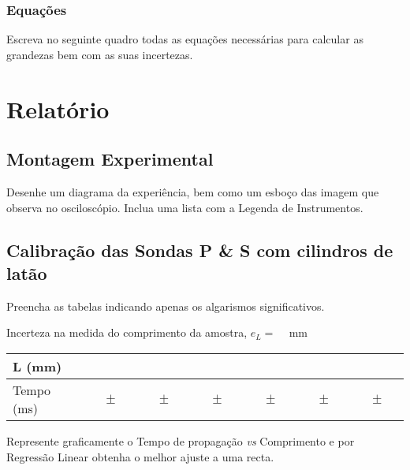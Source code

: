 \documentclass[a4paper,12pt]{article}  %
\begin{document}
\subsubsection{\sf Equações }
Escreva no seguinte quadro todas as equações necessárias para calcular as grandezas bem com as suas incertezas.
\begin{center}
\framebox[15cm]{\rule{0pt}{6.5cm}}
\end{center}


\section{\sf Relatório}
\subsection{\sf Montagem Experimental}
Desenhe um diagrama da experiência, bem como um esboço das imagem que observa no osciloscópio. Inclua uma lista com a Legenda de Instrumentos.

\begin{center}
\framebox[18cm]{\rule{0pt}{6.5cm}}
\end{center}

\subsection{\sf Calibração das Sondas P \& S com cilindros de latão}%
Preencha as  tabelas indicando  apenas os algarismos significativos. 

Incerteza na medida do comprimento da amostra, $e_L=$ ~\underline{\makebox[1cm][r]{~}} mm%

\begin{center}
	\begin{tabular}{|l|c|c|c|c|c|c|}
	\hline
	 L (mm)  & & & & & &  \\
	\hline 
	 Tempo (ms) & $ \quad \pm \quad $ &$ \quad \pm \quad $ &$ \quad \pm \quad $ &$ \quad \pm \quad $ &$ \quad \pm \quad $ &$ \quad \pm \quad $ \\
\hline
				\end{tabular}
\end{center}

Represente graficamente o Tempo de propagação \emph{vs} Comprimento e por Regressão Linear obtenha o melhor ajuste a uma recta.
\end{document}
